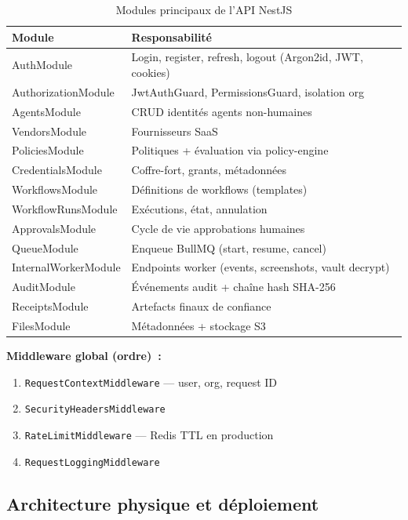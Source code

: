 \begin{table}[H]
\centering
\caption{Modules principaux de l'API NestJS}
\label{tab:modules_api}
\small
\begin{tabularx}{\textwidth}{@{}p{3.2cm}X@{}}
\toprule
\textbf{Module} & \textbf{Responsabilité} \\
\midrule
\rowcolor{rowgray}
AuthModule & Login, register, refresh, logout (Argon2id, JWT, cookies) \\
AuthorizationModule & JwtAuthGuard, PermissionsGuard, isolation org \\
\rowcolor{rowgray}
AgentsModule & CRUD identités agents non-humaines \\
VendorsModule & Fournisseurs SaaS \\
\rowcolor{rowgray}
PoliciesModule & Politiques + évaluation via policy-engine \\
CredentialsModule & Coffre-fort, grants, métadonnées \\
\rowcolor{rowgray}
WorkflowsModule & Définitions de workflows (templates) \\
WorkflowRunsModule & Exécutions, état, annulation \\
\rowcolor{rowgray}
ApprovalsModule & Cycle de vie approbations humaines \\
QueueModule & Enqueue BullMQ (start, resume, cancel) \\
\rowcolor{rowgray}
InternalWorkerModule & Endpoints worker (events, screenshots, vault decrypt) \\
AuditModule & Événements audit + chaîne hash SHA-256 \\
\rowcolor{rowgray}
ReceiptsModule & Artefacts finaux de confiance \\
FilesModule & Métadonnées + stockage S3 \\
\bottomrule
\end{tabularx}
\end{table}

\textbf{Middleware global (ordre)~:}
\begin{enumerate}[leftmargin=1.8cm, itemsep=2pt]
  \item \texttt{RequestContextMiddleware} — user, org, request ID
  \item \texttt{SecurityHeadersMiddleware}
  \item \texttt{RateLimitMiddleware} — Redis TTL en production
  \item \texttt{RequestLoggingMiddleware}
\end{enumerate}

\subsection{Architecture physique et déploiement}

